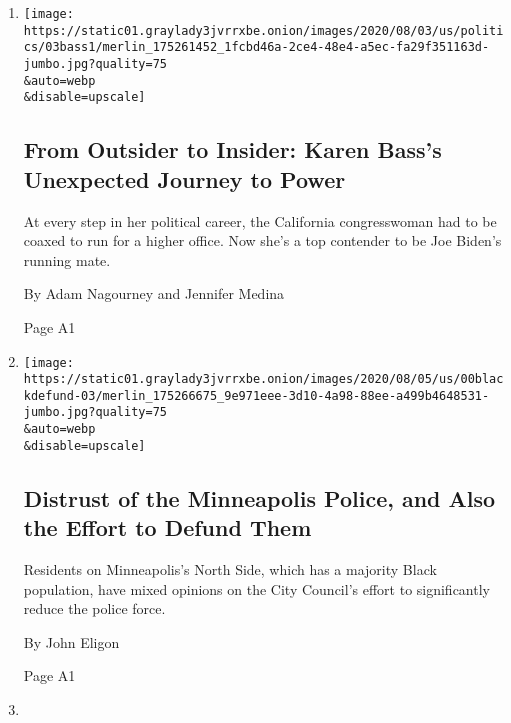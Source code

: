 \begin{enumerate}
\def\labelenumi{\arabic{enumi}.}
\item
  \href{/2020/08/04/us/politics/karen-bass-vice-president-biden.html}{}

  \texttt{[image: https://static01.graylady3jvrrxbe.onion/images/2020/08/03/us/politics/03bass1/merlin\_175261452\_1fcbd46a-2ce4-48e4-a5ec-fa29f351163d-jumbo.jpg?quality=75\\\&auto=webp\\\&disable=upscale]}

  \hypertarget{from-outsider-to-insider-karen-basss-unexpected-journey-to-power}{%
  \subsection{From Outsider to Insider: Karen Bass's Unexpected Journey
  to
  Power}\label{from-outsider-to-insider-karen-basss-unexpected-journey-to-power}}

  At every step in her political career, the California congresswoman
  had to be coaxed to run for a higher office. Now she's a top contender
  to be Joe Biden's running mate.

  By Adam Nagourney and Jennifer Medina

  Page A1
\item
  \href{/2020/08/04/us/minneapolis-defund-police.html}{}

  \texttt{[image: https://static01.graylady3jvrrxbe.onion/images/2020/08/05/us/00blackdefund-03/merlin\_175266675\_9e971eee-3d10-4a98-88ee-a499b4648531-jumbo.jpg?quality=75\\\&auto=webp\\\&disable=upscale]}

  \hypertarget{distrust-of-the-minneapolis-police-and-also-the-effort-to-defund-them}{%
  \subsection{Distrust of the Minneapolis Police, and Also the Effort to
  Defund
  Them}\label{distrust-of-the-minneapolis-police-and-also-the-effort-to-defund-them}}

  Residents on Minneapolis's North Side, which has a majority Black
  population, have mixed opinions on the City Council's effort to
  significantly reduce the police force.

  By John Eligon

  Page A1
\item
  \href{/2020/08/04/us/hurricane-isaias-updates.html}{}

  \hypertarget{isaias-unleashes-floods-and-tornadoes-as-it-pummels-the-atlantic-coast}{%
}
\end{enumerate}
